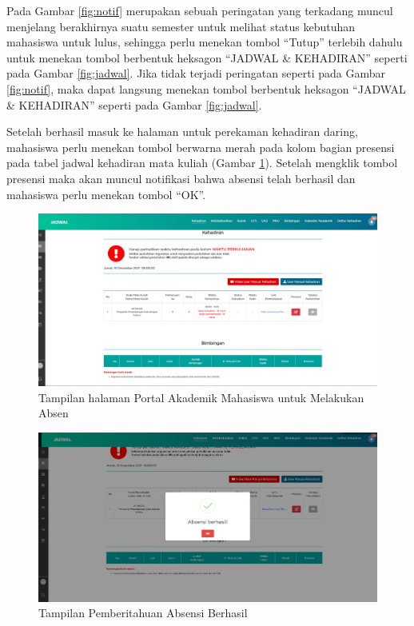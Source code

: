 Pada Gambar \ref{fig:notif} merupakan sebuah peringatan yang terkadang muncul menjelang berakhirnya suatu semester untuk melihat status kebutuhan mahasiswa untuk lulus, sehingga perlu menekan tombol ``Tutup'' terlebih dahulu untuk menekan tombol berbentuk heksagon ``JADWAL \& KEHADIRAN'' seperti pada Gambar \ref{fig:jadwal}. Jika tidak terjadi peringatan seperti pada  Gambar \ref{fig:notif}, maka dapat langsung menekan tombol berbentuk heksagon ``JADWAL \& KEHADIRAN'' seperti pada Gambar \ref{fig:jadwal}.

Setelah berhasil masuk ke halaman untuk perekaman kehadiran daring, mahasiswa perlu menekan tombol berwarna merah pada kolom bagian presensi pada tabel jadwal kehadiran mata kuliah (Gambar \ref{fig:absen}). Setelah mengklik tombol presensi maka akan muncul notifikasi bahwa absensi telah berhasil dan mahasiswa perlu menekan tombol ``OK''. 	
\begin{figure}[H]
	\centering
	\includegraphics[scale=0.225]{Gambar/absen.jpg}
	\caption{Tampilan halaman Portal Akademik Mahasiswa untuk Melakukan Absen} 
	\label{fig:absen}
\end{figure}
\begin{figure}[H]
	\centering
	\includegraphics[scale=0.225]{Gambar/berhasilAbsen.jpg}
	\caption{Tampilan Pemberitahuan Absensi Berhasil} 
	\label{fig:berhasil}
\end{figure}


